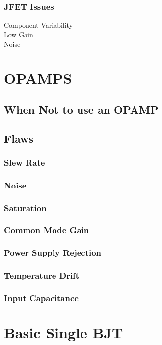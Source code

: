 \documentclass{report}
\begin{document}
\subsection{JFET Issues}
\begin{description}
    \item[Component Variability]
    \item[Low Gain]
    \item[Noise]
\end{description}

\chapter{OPAMPS}
\section{When Not to use an OPAMP}
\section{Flaws}
\subsection{Slew Rate}
\subsection{Noise}
\subsection{Saturation}
\subsection{Common Mode Gain}
\subsection{Power Supply Rejection}
\subsection{Temperature Drift}
\subsection{Input Capacitance}


\chapter{Basic Single BJT}
\end{document}

